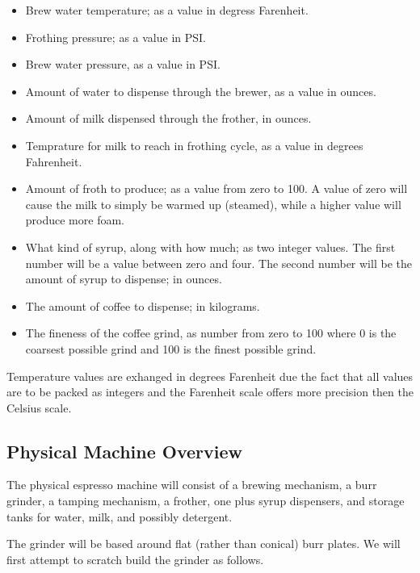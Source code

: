 \documentclass[conference]{IEEEtran}
\begin{document}
\begin{itemize}
\item Brew water temperature; as a value in degress Farenheit.
\item Frothing pressure; as a value in PSI.
\item Brew water pressure, as a value in PSI.
\item Amount of water to dispense through the brewer, as a value in ounces.
\item Amount of milk dispensed through the frother, in ounces.
\item Temprature for milk to reach in frothing cycle, as a value in degrees
Fahrenheit.
\item Amount of froth to produce; as a value from zero to 100. A value of zero will cause the milk
  to simply be warmed up (steamed), while a higher value will produce more foam.
\item What kind of syrup, along with how much; as two integer values. The first number will be a
  value between zero and four. The second number will be the amount of syrup to dispense; in ounces.
\item The amount of coffee to dispense; in kilograms.
\item The fineness of the coffee grind, as number from zero to 100 where 0 is the coarsest possible
  grind and 100 is the finest possible grind.
\end{itemize}

Temperature values are exhanged in degrees Farenheit due the fact that all
values are to be packed as integers and the Farenheit scale offers more
precision then the Celsius scale.

\subsection{Physical Machine Overview}

The physical espresso machine will consist of a brewing mechanism, a
burr grinder, a tamping mechanism, a frother, one plus syrup dispensers, and
storage tanks for water, milk, and possibly detergent.

The grinder will be based around flat (rather than conical) burr plates. We will first
attempt to scratch build the grinder as follows.
\end{document}

